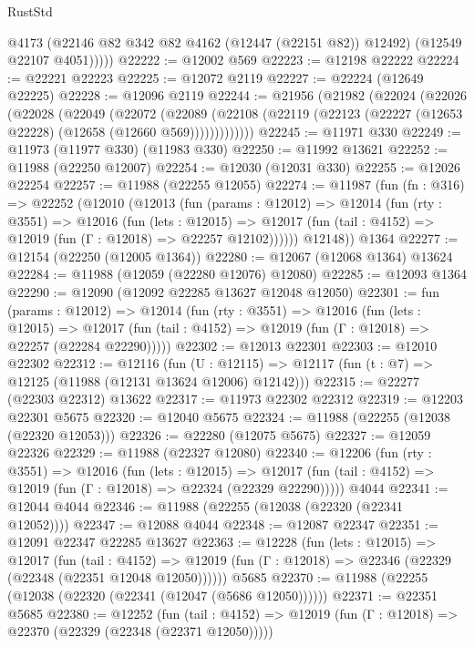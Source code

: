 \begin{lexlean}{RustStd}
\begin{coremodule}
            @4173
            (@22146 @82 @342 @82 @4162 (@12447 (@22151 @82)) @12492)
            (@12549 @22107 @4051)))))
@22222 := @12002 @569
@22223 := @12198 @22222
@22224 := @22221 @22223
@22225 := @12072 @2119
@22227 := @22224 (@12649 @22225)
@22228 := @12096 @2119
@22244 := @21956
    (@21982
      (@22024
        (@22026
          (@22028
            (@22049
              (@22072
                (@22089
                  (@22108 (@22119 (@22123 (@22227 (@12653 @22228) (@12658 (@12660 @569)))))))))))))
@22245 := @11971 @330
@22249 := @11973 (@11977 @330) (@11983 @330)
@22250 := @11992 @13621
@22252 := @11988 (@22250 @12007)
@22254 := @12030 (@12031 @330)
@22255 := @12026 @22254
@22257 := @11988 (@22255 @12055)
@22274 := @11987
    (fun (fn : @316) =>
    @22252
      (@12010
        (@12013
          (fun (params : @12012) =>
          @12014
            (fun (rty : @3551) =>
            @12016
              (fun (lets : @12015) =>
              @12017 (fun (tail : @4152) => @12019 (fun (Γ : @12018) => @22257 @12102))))))
        @12148))
    @1364
@22277 := @12154 (@22250 (@12005 @1364))
@22280 := @12067 (@12068 @1364) @13624
@22284 := @11988 (@12059 (@22280 @12076) @12080)
@22285 := @12093 @1364
@22290 := @12090 (@12092 @22285 @13627 @12048 @12050)
@22301 := fun (params : @12012) =>
  @12014
    (fun (rty : @3551) =>
    @12016
      (fun (lets : @12015) =>
      @12017 (fun (tail : @4152) => @12019 (fun (Γ : @12018) => @22257 (@22284 @22290)))))
@22302 := @12013 @22301
@22303 := @12010 @22302
@22312 := @12116
    (fun (U : @12115) => @12117 (fun (t : @7) => @12125 (@11988 (@12131 @13624 @12006) @12142)))
@22315 := @22277 (@22303 @22312) @13622
@22317 := @11973 @22302 @22312
@22319 := @12203 @22301 @5675
@22320 := @12040 @5675
@22324 := @11988 (@22255 (@12038 (@22320 @12053)))
@22326 := @22280 (@12075 @5675)
@22327 := @12059 @22326
@22329 := @11988 (@22327 @12080)
@22340 := @12206
    (fun (rty : @3551) =>
    @12016
      (fun (lets : @12015) =>
      @12017 (fun (tail : @4152) => @12019 (fun (Γ : @12018) => @22324 (@22329 @22290)))))
    @4044
@22341 := @12044 @4044
@22346 := @11988 (@22255 (@12038 (@22320 (@22341 @12052))))
@22347 := @12088 @4044
@22348 := @12087 @22347
@22351 := @12091 @22347 @22285 @13627
@22363 := @12228
    (fun (lets : @12015) =>
    @12017
      (fun (tail : @4152) =>
      @12019 (fun (Γ : @12018) => @22346 (@22329 (@22348 (@22351 @12048 @12050))))))
    @5685
@22370 := @11988 (@22255 (@12038 (@22320 (@22341 (@12047 (@5686 @12050))))))
@22371 := @22351 @5685
@22380 := @12252
    (fun (tail : @4152) => @12019 (fun (Γ : @12018) => @22370 (@22329 (@22348 (@22371 @12050)))))

\end{coremodule}
\end{lexlean}
